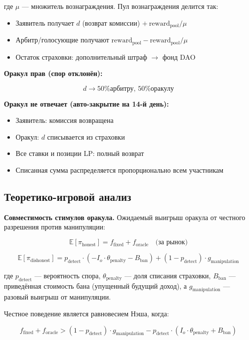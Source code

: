 \documentclass{ledger}
\theoremstyle{plain}
\theoremstyle{remark}
\begin{document}
где $\mu$ --- множитель вознаграждения. Пул вознаграждения делится так:

\begin{itemize}
  \item Заявитель получает $d$ (возврат комиссии) $+\ \text{reward}_{\text{pool}} / \mu$
  \item Арбитр/голосующие получают $\text{reward}_{\text{pool}} -
  \text{reward}_{\text{pool}} / \mu$
  \item Остаток страховки: дополнительный штраф $\rightarrow$ фонд DAO
\end{itemize}

\textbf{Оракул прав (спор отклонён):}

\[
d \rightarrow \text{50\% арбитру, 50\% оракулу}
\]

\textbf{Оракул не отвечает (авто-закрытие на 14-й день):}

\begin{itemize}
  \item Заявитель: комиссия возвращена
  \item Оракул: $d$ списывается из страховки
  \item Все ставки и позиции LP: полный возврат
  \item Списанная сумма распределяется пропорционально всем участникам
\end{itemize}

\subsection{Теоретико-игровой анализ}\label{sec:gametheory}

\textbf{Совместимость стимулов оракула.} Ожидаемый выигрыш оракула от честного
разрешения против манипуляции:

\[
\mathbb{E}[\pi_{\text{honest}}] = f_{\text{fixed}} + f_{\text{oracle}} \quad
\text{(за рынок)}
\]

\[
\mathbb{E}[\pi_{\text{dishonest}}] = p_{\text{detect}} \cdot (-I_o \cdot
\theta_{\text{penalty}} - B_{\text{ban}}) + (1 - p_{\text{detect}}) \cdot
g_{\text{manipulation}}
\]

где $p_{\text{detect}}$ --- вероятность спора, $\theta_{\text{penalty}}$ --- доля
списания страховки, $B_{\text{ban}}$ --- приведённая стоимость бана (упущенный
будущий доход), а $g_{\text{manipulation}}$ --- разовый выигрыш от манипуляции.

Честное поведение является равновесием Нэша, когда:

\[
f_{\text{fixed}} + f_{\text{oracle}} > (1 - p_{\text{detect}}) \cdot
g_{\text{manipulation}} - p_{\text{detect}} \cdot (I_o \cdot \theta_{\text{penalty}}
+ B_{\text{ban}})
\]
\end{document}
